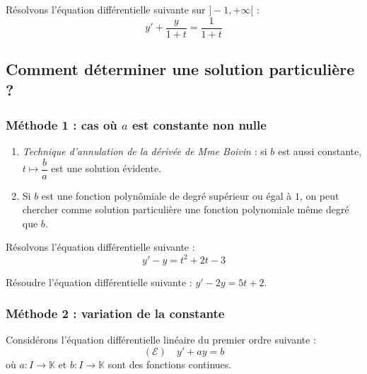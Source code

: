 \documentclass[french,11pt,twoside]{VcCours}
\begin{document}
\begin{Exemple} Résolvons l'équation différentielle suivante sur $]-1, + \infty[$ :
$$ y'+ \frac{y}{1+t}= \dfrac{1}{1+t} $$

\vspace*{4cm}
\end{Exemple}

\subsection{Comment déterminer une solution particulière ?}



\subsubsection*{Méthode 1 : cas où $a$ est constante non nulle}

\begin{enumerate}
\item \emph{Technique d'annulation de la dérivée de Mme Boivin} : si $b$ est aussi constante, $t \mapsto \dfrac{b}{a}$ est une solution évidente.
\item Si $b$ est une fonction polynômiale de degré supérieur ou égal à $1$, on peut chercher comme solution particulière une fonction polynomiale même degré que $b$.
\end{enumerate}



\begin{Exemple} Résolvons l'équation différentielle suivante :
$$ y'-y = t^2+2t-3$$

\newpage
\vspace*{5cm}
\end{Exemple}

\begin{ApplicationDirecte}{} Résoudre l'équation différentielle suivante : $y'-2y=5t+2$.
\end{ApplicationDirecte}



\subsubsection*{Méthode 2 : variation de la constante}

Considérons l'équation différentielle linéaire du premier ordre suivante : 
$$(\mathcal{E}) \quad y'+a y= b $$
où $a : I \rightarrow \mathbb{K}$ et $b : I \rightarrow \mathbb{K}$ sont des fonctions continues.
\end{document}
